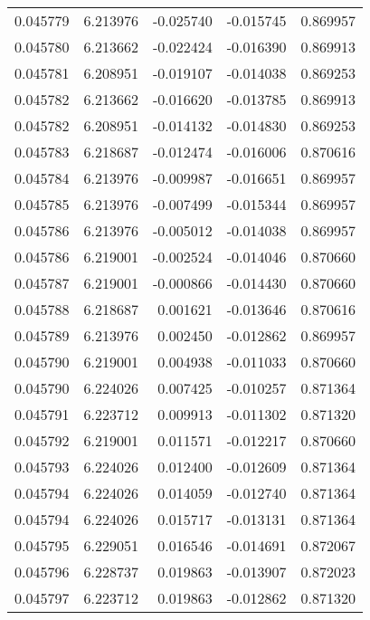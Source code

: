 \begin{tabular}{lrrrr}
0.045779    &  6.213976 & -0.025740 & -0.015745 &             0.869957 \\
0.045780    &  6.213662 & -0.022424 & -0.016390 &             0.869913 \\
0.045781    &  6.208951 & -0.019107 & -0.014038 &             0.869253 \\
0.045782    &  6.213662 & -0.016620 & -0.013785 &             0.869913 \\
0.045782    &  6.208951 & -0.014132 & -0.014830 &             0.869253 \\
0.045783    &  6.218687 & -0.012474 & -0.016006 &             0.870616 \\
0.045784    &  6.213976 & -0.009987 & -0.016651 &             0.869957 \\
0.045785    &  6.213976 & -0.007499 & -0.015344 &             0.869957 \\
0.045786    &  6.213976 & -0.005012 & -0.014038 &             0.869957 \\
0.045786    &  6.219001 & -0.002524 & -0.014046 &             0.870660 \\
0.045787    &  6.219001 & -0.000866 & -0.014430 &             0.870660 \\
0.045788    &  6.218687 &  0.001621 & -0.013646 &             0.870616 \\
0.045789    &  6.213976 &  0.002450 & -0.012862 &             0.869957 \\
0.045790    &  6.219001 &  0.004938 & -0.011033 &             0.870660 \\
0.045790    &  6.224026 &  0.007425 & -0.010257 &             0.871364 \\
0.045791    &  6.223712 &  0.009913 & -0.011302 &             0.871320 \\
0.045792    &  6.219001 &  0.011571 & -0.012217 &             0.870660 \\
0.045793    &  6.224026 &  0.012400 & -0.012609 &             0.871364 \\
0.045794    &  6.224026 &  0.014059 & -0.012740 &             0.871364 \\
0.045794    &  6.224026 &  0.015717 & -0.013131 &             0.871364 \\
0.045795    &  6.229051 &  0.016546 & -0.014691 &             0.872067 \\
0.045796    &  6.228737 &  0.019863 & -0.013907 &             0.872023 \\
0.045797    &  6.223712 &  0.019863 & -0.012862 &             0.871320 \\

\end{tabular}
